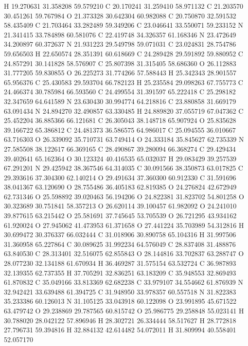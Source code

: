 \documentclass{article}
\begin{document}
H 19.270631 31.358208 59.579210
C 20.170241 31.259410 58.971132
C 21.203570 30.451261 59.767984
O 21.373328 30.642304 60.982088
C 20.750870 32.591532 58.435409
C 21.703464 33.282489 59.349206
C 23.046641 33.550071 59.233152
N 21.341415 33.784898 60.581076
C 22.419748 34.326357 61.168346
N 23.472649 34.200897 60.372637
N 21.931223 29.549798 59.071031
C 23.024831 28.754786 59.656503
H 22.650574 28.351391 60.618669
C 24.289428 29.591892 59.880952
C 24.857291 30.141828 58.576907
C 25.807398 31.315405 58.686360
O 26.112883 31.777205 59.830855
O 26.225273 31.774266 57.588443
H 25.342343 28.901557 65.956376
C 25.430583 29.593704 66.782123
H 25.235584 29.098263 67.755773
C 24.466374 30.785984 66.593560
C 24.499554 31.391597 65.222418
C 25.298182 32.347659 64.641589
N 23.630430 30.994774 64.218816
C 23.880858 31.669179 63.091434
N 24.894270 32.490857 63.330485
H 24.889820 37.055719 67.047362
C 25.452204 36.885366 66.121681
C 26.305043 38.148718 65.907924
O 25.835628 39.166722 65.386812
C 24.481373 36.586575 64.986017
C 25.094555 36.010667 63.716303
O 26.339092 35.710731 63.749414
O 24.333184 35.845627 62.735339
N 27.585508 38.122617 66.369165
C 28.490867 39.280094 66.368274
C 29.429434 39.402641 65.162364
O 30.123324 40.416535 65.032037
H 29.083429 39.257539 67.291201
N 29.425942 38.367546 64.314035
C 30.091566 38.350873 63.017825
C 29.393616 37.304300 62.140214
O 29.491634 37.360300 60.912330
C 31.591696 38.041367 63.120690
O 28.755486 36.405183 62.819385
O 24.276824 42.672949 62.731346
O 25.598892 39.020463 56.194206
O 24.822381 31.823702 54.801258
O 30.323689 30.751841 58.357213
O 26.620114 39.100457 61.982092
O 24.241010 39.877615 63.215442
O 25.581691 37.745645 53.705539
O 26.721295 43.934162 61.920024
O 27.945062 41.473953 61.371658
O 27.441224 35.703989 54.312816
H 30.699472 30.376337 66.032444
C 31.018906 30.890758 65.104316
H 31.997506 31.360958 65.227864
C 30.089625 31.992234 64.576049
C 28.837408 31.488876 63.840530
C 28.313401 32.516075 62.855843
O 28.144816 33.702837 63.288747
O 28.077230 32.134188 61.670934
H 36.469287 31.575154 63.532724
C 36.987893 32.139355 62.737355
H 37.705291 32.836251 63.183209
C 35.948553 32.869493 61.870832
C 35.049166 33.813369 62.682238
C 33.979107 34.554662 61.876939
N 32.942421 33.639488 61.394725
C 31.948950 33.978357 60.557518
N 31.822383 35.233386 60.126013
N 31.105125 33.043918 60.122098
O 23.991895 45.671522 63.479742
O 29.238869 29.787565 60.815742
O 25.986775 29.258848 55.023141
H 30.788020 28.042122 57.896946
H 28.302721 26.334444 58.517627
H 28.772818 27.796731 59.394816
H 32.884132 42.614482 54.072011
H 31.809994 40.558401 52.057170
\end{document}
